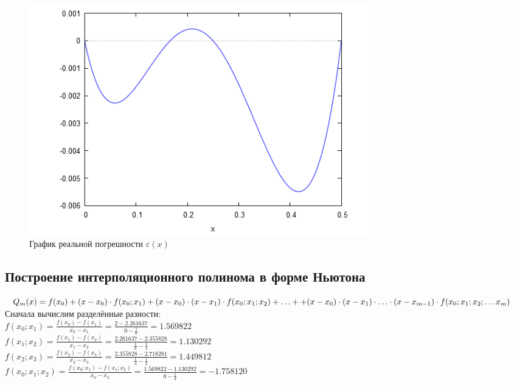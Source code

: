 \begin{figure}[H]
	\begin{center}
		\includegraphics[width=15cm]{lagrange.png}
		\caption{График реальной погрешности $\varepsilon(x)$} 
		\label{pic:1}
	\end{center}
\end{figure}


\subsection{Построение интерполяционного полинома в форме Ньютона}

$Q_m(x) = f(x_0) + (x - x_0) \cdot f(x_0;x_1) + (x - x_0) \cdot (x - x_1) \cdot f(x_0;x_1;x_2) + \ldots + \\[1mm] + (x - x_0) \cdot (x - x_1) \cdot \ldots \cdot (x - x_{m-1}) \cdot f(x_0;x_1;x_2; \ldots x_m)$\\[3mm]

Сначала вычислим разделённые разности:\\[3mm]

$f(x_0; x_1) = \frac{f(x_0) - f(x_1)}{x_0 - x_1} = \frac{2 - 2.261637}{0 - \frac{1}{6}} = 1.569822$\\[1mm]

$f(x_1; x_2) = \frac{f(x_1) - f(x_2)}{x_1 - x_2} = \frac{2.261637 - 2.355828}{\frac{1}{6} - \frac{1}{4}} = 1.130292$\\[1mm]

$f(x_2; x_3) = \frac{f(x_2) - f(x_3)}{x_2 - x_3} = \frac{2.355828 - 2.718281}{\frac{1}{4} - \frac{1}{2}} = 1.449812$\\[1mm]

$f(x_0; x_1; x_2) = \frac{f(x_0; x_1) - f(x_1; x_2)}{x_0 - x_2} = \frac{1.569822 - 1.130292}{0 - \frac{1}{4}} = -1.758120$\\[1mm]

